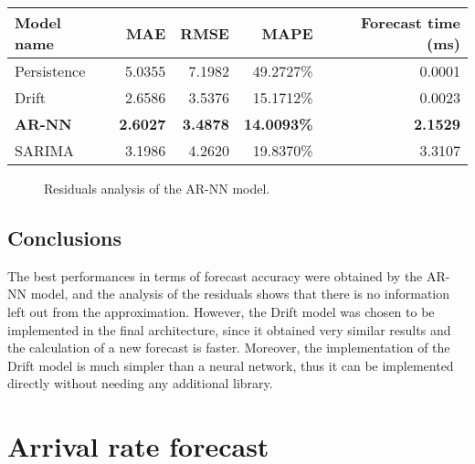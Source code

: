 \begin{center}
  \begin{tabular}{ l r r r r }
    \hline
    Model name     & MAE             & RMSE            & MAPE               & Forecast time (ms) \\
    \hline
    Persistence    & 5.0355          & 7.1982          & 49.2727\%          & 0.0001             \\
    Drift          & 2.6586          & 3.5376          & 15.1712\%          & 0.0023             \\
    \textbf{AR-NN} & \textbf{2.6027} & \textbf{3.4878} & \textbf{14.0093\%} & \textbf{2.1529}    \\
    SARIMA         & 3.1986          & 4.2620          & 19.8370\%          & 3.3107             \\
    \hline
  \end{tabular}
\end{center}

\begin{figure}
  \begin{center}
  \end{center}
  \caption{Residuals analysis of the AR-NN model.}
  \label{fig:inflow_rate_forecast_residuals}
\end{figure}

\subsection{Conclusions}
\label{subsec:inflow_rate_forecast_results_conclusions}

The best performances in terms of forecast accuracy were obtained by the AR-NN model, and the analysis of the residuals shows that there is no information left out from the approximation. However, the Drift model was chosen to be implemented in the final architecture, since it obtained very similar results and the calculation of a new forecast is faster. Moreover, the implementation of the Drift model is much simpler than a neural network, thus it can be implemented directly without needing any additional library.

\section{Arrival rate forecast}
\label{sec:arrival_rate_forecast_results}

